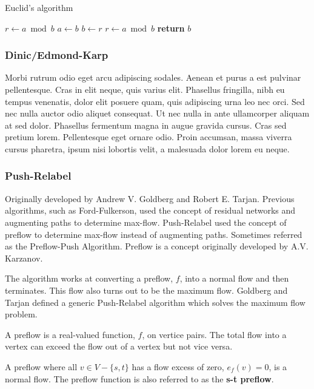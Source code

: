 \begin{algorithm}
	\caption{Euclid’s algorithm}\label{alg:euclid}
	\begin{algorithmic}[1]
		\State $r\gets a\bmod b$
		\State $a\gets b$
		\State $b\gets r$
		\State $r\gets a\bmod b$
		\EndWhile\label{euclidendwhile}
		\State \textbf{return} $b$
		\EndProcedure
	\end{algorithmic}
\end{algorithm}


\subsubsection{Dinic/Edmond-Karp}
Morbi rutrum odio eget arcu adipiscing sodales. Aenean et purus a est pulvinar pellentesque. Cras in elit neque, quis varius elit. Phasellus fringilla, nibh eu tempus venenatis, dolor elit posuere quam, quis adipiscing urna leo nec orci. Sed nec nulla auctor odio aliquet consequat. Ut nec nulla in ante ullamcorper aliquam at sed dolor. Phasellus fermentum magna in augue gravida cursus. Cras sed pretium lorem. Pellentesque eget ornare odio. Proin accumsan, massa viverra cursus pharetra, ipsum nisi lobortis velit, a malesuada dolor lorem eu neque.


\subsubsection{Push-Relabel}
Originally developed by Andrew V. Goldberg and Robert E. Tarjan. Previous algorithms, such as Ford-Fulkerson, used the concept of residual networks and augmenting paths to determine max-flow.
Push-Relabel used the concept of preflow to determine  max-flow instead of augmenting paths. Sometimes referred as the Preflow-Push Algorithm.
Preflow is a concept originally developed by A.V. Karzanov.

The algorithm works at converting a preflow, $f$, into a normal flow and then terminates. This flow also turns out to be the maximum flow. Goldberg and Tarjan defined a generic Push-Relabel algorithm  which solves the maximum flow problem.

\begin{definition}[Preflow]
	A preflow is a real-valued function, $f$, on vertice pairs. The total flow into a vertex can exceed the flow out of a vertex but not vice versa.
\end{definition}
A preflow where all $v \in V-\{s, t\}$ has a flow excess of zero, $e_f(v) = 0$, is a normal flow. The preflow function is also referred to as the \textbf{s-t preflow}.

